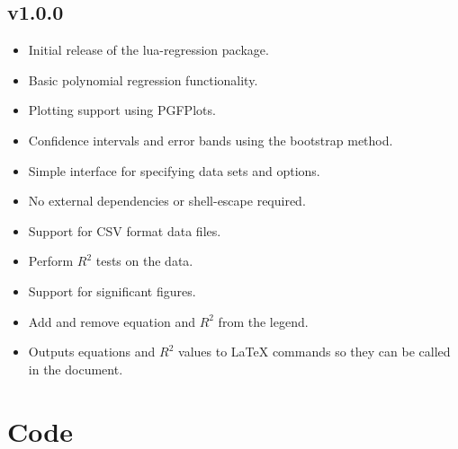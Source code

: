\documentclass[11pt]{article}
\begin{document}
    \subsection*{v1.0.0}

    \begin{itemize}
        \item Initial release of the {\ttfamily lua-regression} package.
        \item Basic polynomial regression functionality.
        \item Plotting support using PGFPlots.
        \item Confidence intervals and error bands using the bootstrap method.
        \item Simple interface for specifying data sets and options.
        \item No external dependencies or {\ttfamily shell-escape} required.
        \item Support for CSV format data files.
        \item Perform $R^2$ tests on the data.
        \item Support for significant figures.
        \item Add and remove equation and $R^2$ from the legend.
        \item Outputs equations and $R^2$ values to LaTeX commands so they can be called in the document.
    \end{itemize}

    \pagebreak

    \section{Code}

    \inputminted[autogobble, breaklines, breakanywhere, firstline=22, linenos]{latex}{../tex/lua-regression.sty}
\end{document}
